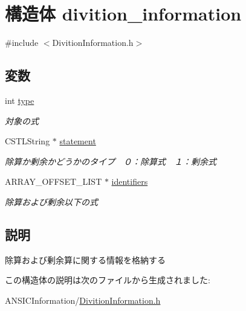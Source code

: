 \hypertarget{structdivition__information}{
\section{構造体 divition\_\-information}
\label{structdivition__information}
}


{\ttfamily \#include $<$DivitionInformation.h$>$}

\subsection*{変数}
\begin{DoxyCompactItemize}
\item 
\hypertarget{structdivition__information_a47c7af44ae5f360dc369efd35b72129e}{
int \hyperlink{structdivition__information_a47c7af44ae5f360dc369efd35b72129e}{type}}
\label{structdivition__information_a47c7af44ae5f360dc369efd35b72129e}

\begin{DoxyCompactList}\small\item\em 対象の式 \item\end{DoxyCompactList}\item 
\hypertarget{structdivition__information_ad79d014f72312183ee99402b6b2001e9}{
CSTLString $\ast$ \hyperlink{structdivition__information_ad79d014f72312183ee99402b6b2001e9}{statement}}
\label{structdivition__information_ad79d014f72312183ee99402b6b2001e9}

\begin{DoxyCompactList}\small\item\em 除算か剰余かどうかのタイプ　０：除算式　１：剰余式 \item\end{DoxyCompactList}\item 
\hypertarget{structdivition__information_aef16f1ef4d1f8cb9e2440017dd8c004f}{
ARRAY\_\-OFFSET\_\-LIST $\ast$ \hyperlink{structdivition__information_aef16f1ef4d1f8cb9e2440017dd8c004f}{identifiers}}
\label{structdivition__information_aef16f1ef4d1f8cb9e2440017dd8c004f}

\begin{DoxyCompactList}\small\item\em 除算および剰余以下の式 \item\end{DoxyCompactList}\end{DoxyCompactItemize}


\subsection{説明}
除算および剰余算に関する情報を格納する 

この構造体の説明は次のファイルから生成されました:\begin{DoxyCompactItemize}
\item 
ANSICInformation/\hyperlink{DivitionInformation_8h}{DivitionInformation.h}\end{DoxyCompactItemize}
